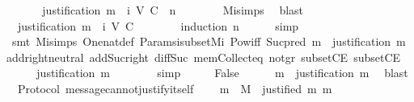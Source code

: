 \begin{isabellebody}
\ \ \isamarkupfalse%
\ \isamarkupfalse%
\ \ {\isachardoublequoteopen}justification\ m\ {\isasymin}\ {\isasymSigma}{\isacharunderscore}i\ {\isacharparenleft}V{\isacharcomma}\ C{\isacharcomma}\ {\isasymepsilon}{\isacharparenright}\ {\isacharparenleft}n\ {\isacharminus}\ {}{\isacharparenright}{\isachardoublequoteclose}\isanewline
\ \ \ \ \isamarkupfalse%
\ M{\isacharunderscore}i{\isachardot}simps\ \isamarkupfalse%
\ blast\isanewline
\ \ \isamarkupfalse%
\ \isamarkupfalse%
\ \ {\isachardoublequoteopen}justification\ m\ {\isasymin}\ {\isasymSigma}{\isacharunderscore}i\ {\isacharparenleft}V{\isacharcomma}\ C{\isacharcomma}\ {\isasymepsilon}{\isacharparenright}\ {}{\isachardoublequoteclose}\isanewline
\ \ \ \ \isamarkupfalse%
\ {\isacharparenleft}induction\ n{\isacharparenright}\isanewline
\ \ \ \ \isamarkupfalse%
\ simp\isanewline
\ \ \ \ \isamarkupfalse%
\ {\isacharparenleft}smt\ M{\isacharunderscore}i{\isachardot}simps\ One{\isacharunderscore}nat{\isacharunderscore}def\ Params{\isachardot}{\isasymSigma}i{\isacharunderscore}subset{\isacharunderscore}Mi\ Pow{\isacharunderscore}iff\ Suc{\isacharunderscore}pred\ {\isacartoucheopen}m\ {\isasymin}\ justification\ m{\isacartoucheclose}\ add{\isachardot}right{\isacharunderscore}neutral\ add{\isacharunderscore}Suc{\isacharunderscore}right\ diff{\isacharunderscore}Suc{\isacharunderscore}{}\ mem{\isacharunderscore}Collect{\isacharunderscore}eq\ not{\isacharunderscore}gr{}\ subsetCE\ subsetCE{\isacharparenright}\isanewline
\ \ \isamarkupfalse%
\ \isamarkupfalse%
\ {\isachardoublequoteopen}justification\ m\ {\isasymin}\ {\isacharbraceleft}{\isasymemptyset}{\isacharbraceright}{\isachardoublequoteclose}\isanewline
\ \ \ \ \isamarkupfalse%
\ simp\isanewline
\ \ \isamarkupfalse%
\ \isamarkupfalse%
\ False\isanewline
\ \ \ \ \isamarkupfalse%
\ {\isacartoucheopen}m\ {\isasymin}\ justification\ m{\isacartoucheclose}\ \isamarkupfalse%
\ blast\isanewline
{}\isamarkupfalse%
%
\endisatagproof
{\isafoldproof}%
%
\isadelimproof
\isanewline
%
\endisadelimproof
\isanewline
{}\isamarkupfalse%
\ {\isacharparenleft}\ Protocol{\isacharparenright}\ message{\isacharunderscore}cannot{\isacharunderscore}justify{\isacharunderscore}itself\ {\isacharcolon}\isanewline
\ \ {\isachardoublequoteopen}{\isacharparenleft}{\isasymforall}\ m\ {\isasymin}\ M{\isachardot}\ {\isasymnot}\ justified\ m\ m{\isacharparenright}{\isachardoublequoteclose}\isanewline

\end{isabellebody}
